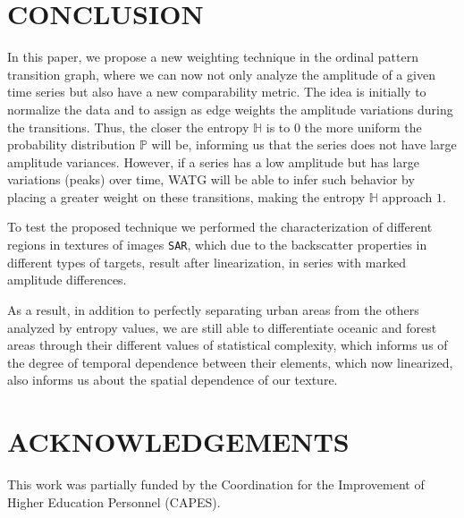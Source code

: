 \documentclass{isprs}
\begin{document}
	
	\section{CONCLUSION}\label{Conclusion}
	
	In this paper, we propose a new weighting technique in the ordinal pattern transition graph, where we can now not only analyze the amplitude of a given time series but also have a new comparability metric.
	The idea is initially to normalize the data and to assign as edge weights the amplitude variations during the transitions.
	Thus, the closer the entropy $\mathbb{H}$ is to $0$ the more uniform the probability distribution $\mathbb{P}$ will be, informing us that the series does not have large amplitude variances.
	However, if a series has a low amplitude but has large variations (peaks) over time, WATG will be able to infer such behavior by placing a greater weight on these transitions, making the entropy $\mathbb{H}$ approach $1$.
	
	To test the proposed technique we performed the characterization of different regions in textures of images \texttt{SAR}, which due to the backscatter properties in different types of targets, result after linearization, in series with marked amplitude differences.
	
	As a result, in addition to perfectly separating urban areas from the others analyzed by entropy values, we are still able to differentiate oceanic and forest areas through their different values of statistical complexity, which informs us of the degree of temporal dependence between their elements, which now linearized, also informs us about the spatial dependence of our texture.
	
	
	
	
	\section*{ACKNOWLEDGEMENTS}\label{ACKNOWLEDGEMENTS}
	
	This work was partially funded by the Coordination for the Improvement of Higher Education Personnel (CAPES).
\end{document}
